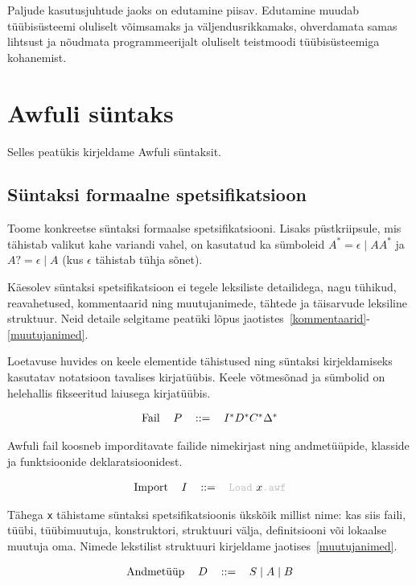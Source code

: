 \documentclass[12pt]{article}
\newcommand\peatykk[1]{
  \clearpage
  \section{#1}}
\begin{document}
      Paljude kasutusjuhtude jaoks on edutamine piisav. Edutamine muudab tüübisüsteemi oluliselt võimsamaks ja väljendusrikkamaks, ohverdamata samas lihtsust ja nõudmata programmeerijalt oluliselt teistmoodi tüübisüsteemiga kohanemist.
  \peatykk{Awfuli süntaks}\label{syntaks}
    Selles peatükis kirjeldame Awfuli süntaksit.
    \subsection{Süntaksi formaalne spetsifikatsioon}
    Toome konkreetse süntaksi formaalse spetsifikatsiooni. Lisaks püstkriipsule, mis tähistab valikut kahe variandi vahel, on kasutatud ka sümboleid $A^*=\epsilon\mid AA^*$ ja $A?=\epsilon\mid A$ (kus $\epsilon$ tähistab tühja sõnet).

    Käesolev süntaksi spetsifikatsioon ei tegele leksiliste detailidega, nagu tühikud, reavahetused, kommentaarid ning muutujanimede, tähtede ja täisarvude leksiline struktuur. Neid detaile selgitame peatüki lõpus jaotistes~\ref{kommentaarid}-\ref{muutujanimed}.

    Loetavuse huvides on keele elementide tähistused ning süntaksi kirjeldamiseks kasutatav notatsioon tavalises kirjatüübis. Keele võtmesõnad ja sümbolid on helehallis fikseeritud laiusega kirjatüübis.

    \begin{equation*}
      \begin{tabular}{llll}
        Fail & $P$ & $::=$ & $I^*D^*C^*\Delta^*$
      \end{tabular}
    \end{equation*}

    Awfuli fail koosneb imporditavate failide nimekirjast ning andmetüüpide, klasside ja funktsioonide deklaratsioonidest.

    \begin{equation*}
      \begin{tabular}{llll}
        Import & $I$ & $::=$ & {\color{helehall}\verb!Load!} $x${\color{helehall}\verb!.awf!}
      \end{tabular}
    \end{equation*}

    Tähega \verb!x! tähistame süntaksi spetsifikatsioonis ükskõik millist nime: kas siis faili, tüübi, tüübimuutuja, konstruktori, struktuuri välja, definitsiooni või lokaalse muutuja oma. Nimede lekstilist struktuuri kirjeldame jaotises~\ref{muutujanimed}.

    \begin{equation*}
      \begin{tabular}{llll}
        Andmetüüp & $D$ & $::=$ & $S\mid A\mid B$
      \end{tabular}
    \end{equation*}
\end{document}
